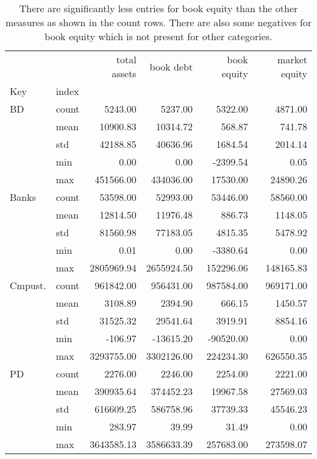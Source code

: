 \begin{table}
\caption{There are significantly less entries for book equity than the other measures as shown in the count rows. There are also some negatives for book equity which is not present for other categories. }
\label{tab:Table 2.1}
\begin{tabular}{llrrrr}
\toprule
 &  & total assets & book debt & book equity & market equity \\
Key & index &  &  &  &  \\
\midrule
{BD} & count & 5243.00 & 5237.00 & 5322.00 & 4871.00 \\
 & mean & 10900.83 & 10314.72 & 568.87 & 741.78 \\
 & std & 42188.85 & 40636.96 & 1684.54 & 2014.14 \\
 & min & 0.00 & 0.00 & -2399.54 & 0.05 \\
 & max & 451566.00 & 434036.00 & 17530.00 & 24890.26 \\
\cline{1-6}
{Banks} & count & 53598.00 & 52993.00 & 53446.00 & 58560.00 \\
 & mean & 12814.50 & 11976.48 & 886.73 & 1148.05 \\
 & std & 81560.98 & 77183.05 & 4815.35 & 5478.92 \\
 & min & 0.01 & 0.00 & -3380.64 & 0.00 \\
 & max & 2805969.94 & 2655924.50 & 152296.06 & 148165.83 \\
\cline{1-6}
{Cmpust.} & count & 961842.00 & 956431.00 & 987584.00 & 969171.00 \\
 & mean & 3108.89 & 2394.90 & 666.15 & 1450.57 \\
 & std & 31525.32 & 29541.64 & 3919.91 & 8854.16 \\
 & min & -106.97 & -13615.20 & -90520.00 & 0.00 \\
 & max & 3293755.00 & 3302126.00 & 224234.30 & 626550.35 \\
\cline{1-6}
{PD} & count & 2276.00 & 2246.00 & 2254.00 & 2221.00 \\
 & mean & 390935.64 & 374452.23 & 19967.58 & 27569.03 \\
 & std & 616609.25 & 586758.96 & 37739.33 & 45546.23 \\
 & min & 283.97 & 39.99 & 31.49 & 0.00 \\
 & max & 3643585.13 & 3586633.39 & 257683.00 & 273598.07 \\
\cline{1-6}
\bottomrule
\end{tabular}
\end{table}
